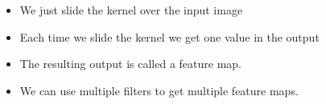
\begin{frame}
	\begin{columns}
		
		\begin{overlayarea}{\textwidth}{\textheight}
			
		\end{overlayarea}
		
		\begin{overlayarea}{\textwidth}{\textheight}
			\begin{itemize}
				\justifying
				\item<1-> We just slide the kernel over the input image
				\item<2-> Each time we slide the kernel we get one value in the output
				\item<20-> The resulting output is called a feature map.
				\item<21-> We can use multiple filters to get multiple feature maps.
				
			\end{itemize}
		\end{overlayarea}
	\end{columns}
\end{frame}


